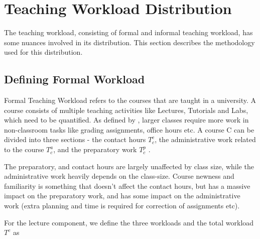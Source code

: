 \chapter{Teaching Workload Distribution}

\label{chapter:formal_informal_workload}

The teaching workload, consisting of formal and informal teaching workload, has some nuances involved in its distribution. This section describes the methodology used for this distribution.

\section{Defining Formal Workload}

\label{section:defining_formal_workload}

Formal Teaching Workload refers to the courses that are taught in a university. A course consists of multiple teaching activities like Lectures, Tutorials and Labs, which need to be quantified. As defined by \cite{griffith2020framework}, larger classes require more work in non-classroom tasks like grading assignments, office hours etc. A course C can be divided into three sections - the contact hours \(T^c_c\), the administrative work related to the course \(T^a_c\), and the preparatory work \(T^p_c\) .

The preparatory, and contact hours are largely unaffected by class size, while the administrative work heavily depends on the class-size. Course newness and familiarity is something that doesn't affect the contact hours, but has a massive impact on the preparatory work, and has some impact on the administrative work (extra planning and time is required for correction of assignments etc).

For the lecture component, we define the three workloads and the total workload \(T^c\) as

